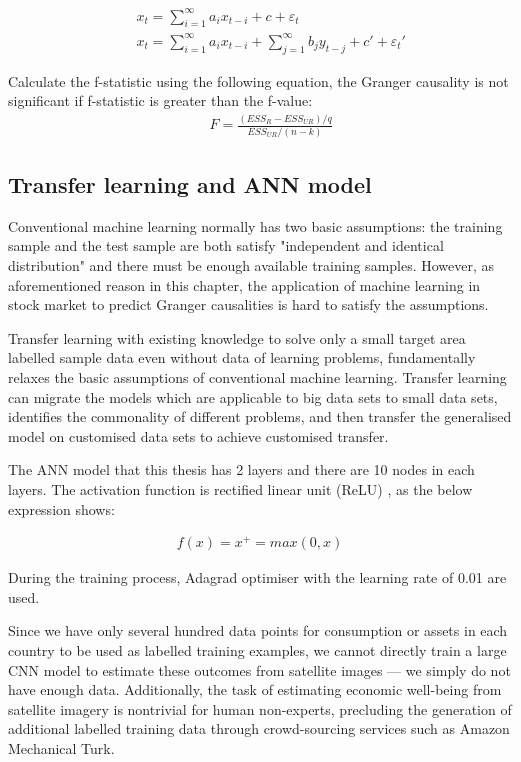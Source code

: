 \begin{eqnarray}
&&	x_t=\sum_{i=1}^{\infty}a_ix_{t-i}+c+\varepsilon_{t}\\
&&x_t=\sum_{i=1}^{\infty}a_ix_{t-i}+\sum_{j=1}^{\infty}b_jy_{t-j}+c'+\varepsilon_{t}'
\end{eqnarray}

Calculate the f-statistic using the following equation, the Granger causality is not significant if f-statistic is greater than the f-value:
\begin{eqnarray}
&&	F=\frac{(ESS_R-ESS_{UR})/q}{ESS_{UR}/(n-k)}
\end{eqnarray}

\subsection{Transfer learning and ANN model}
\label{sbs:transfer}
Conventional machine learning normally has two basic assumptions: the training sample and the test sample are both satisfy "independent and identical distribution" and there must be enough available training samples. However, as aforementioned reason in this chapter, the application of machine learning in stock market to predict Granger causalities is hard to satisfy the assumptions.

Transfer learning with existing knowledge to solve only a small target area labelled sample data even without data of learning problems, fundamentally relaxes the basic assumptions of conventional machine learning. Transfer learning can migrate the models which are applicable to big data sets to small data sets, identifies the commonality of different problems, and then transfer the generalised model on customised data sets to achieve customised transfer.

The ANN model that this thesis has 2 layers and there are 10 nodes in each layers.  The activation function is rectified linear unit (ReLU) \cite{hahnloser2000digital}, as the below expression shows:

\begin{eqnarray}
f\left(x\right)=x^+=max\left(0,x\right)
\end{eqnarray}

During the training process, Adagrad optimiser \cite{duchi2011adaptive} with the learning rate of 0.01 are used.

Since we have only several hundred data points for consumption or assets in each country to be used as labelled training examples, we cannot directly train a large CNN model to estimate these outcomes from satellite images — we simply do not have enough data. Additionally, the task of estimating economic well-being from satellite imagery is nontrivial for human non-experts, precluding the generation of additional labelled training data through crowd-sourcing services such as Amazon Mechanical Turk.

